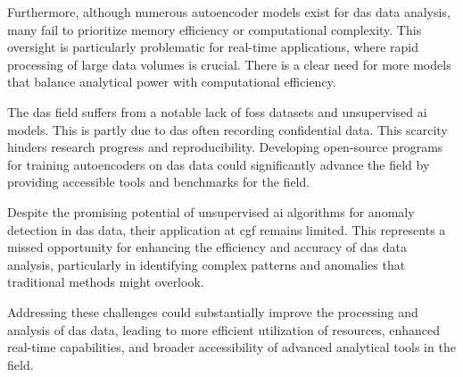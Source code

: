 Furthermore, although numerous autoencoder models exist for \acrshort{das} data analysis, many fail to prioritize memory efficiency or computational complexity. This oversight is particularly problematic for real-time applications, where rapid processing of large data volumes is crucial. There is a clear need for more models that balance analytical power with computational efficiency. 

The \acrshort{das} field suffers from a notable lack of \acrfull{foss} datasets and unsupervised \acrshort{ai} models. This is partly due to \acrshort{das} often recording confidential data. This scarcity hinders research progress and reproducibility. Developing open-source programs for training autoencoders on \acrshort{das} data could significantly advance the field by providing accessible tools and benchmarks for the field.  

Despite the promising potential of unsupervised \acrshort{ai} algorithms for anomaly detection in \acrshort{das} data, their application at \acrshort{cgf} remains limited. This represents a missed opportunity for enhancing the efficiency and accuracy of \acrshort{das} data analysis, particularly in identifying complex patterns and anomalies that traditional methods might overlook.

Addressing these challenges could substantially improve the processing and analysis of \acrshort{das} data, leading to more efficient utilization of resources, enhanced real-time capabilities, and broader accessibility of advanced analytical tools in the field.


